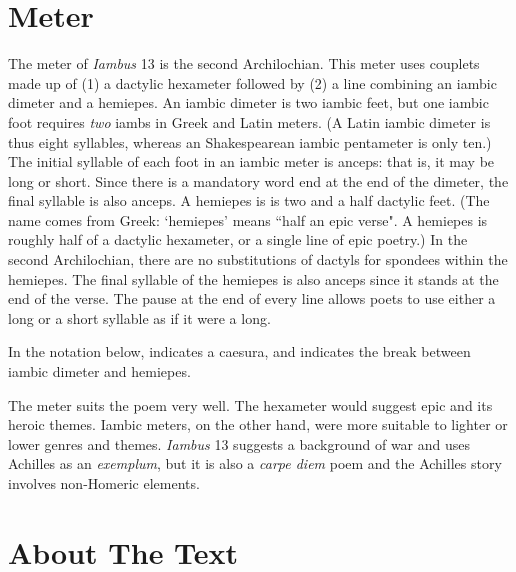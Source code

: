 
\section*{Meter}

The meter of \textit{Iambus} 13 is the second Archilochian. This meter uses couplets made up of (1) a dactylic hexameter followed by (2) a line combining an iambic dimeter and a hemiepes.  An iambic dimeter is two iambic feet, but one iambic foot requires \textit{two} iambs in Greek and Latin meters.  (A Latin iambic dimeter is thus eight syllables, whereas an Shakespearean iambic pentameter is only ten.)  The initial syllable of each foot in an iambic meter is anceps: that is, it may be long or short.  Since there is a mandatory word end at the end of the dimeter, the final syllable is also anceps.  A hemiepes is is two and a half dactylic feet.  (The name comes from Greek: `hemiepes' means ``half an epic verse".  A hemiepes is roughly half of a dactylic hexameter, or a single line of epic poetry.)  In the second Archilochian, there are no substitutions of dactyls for spondees within the hemiepes.  The final syllable of the hemiepes is also anceps since it stands at the end of the verse.  The pause at the end of every line allows poets to use either a long or a short syllable as if it were a long.

In the notation below, \metra{\c} indicates a caesura, and \metra{\cc} indicates the break between iambic dimeter and hemiepes.\newline

\indent\metra{\m\mbb\m\mbb\m\c\mbb\m\mbb\m\mbb\m\mb}

\indent\indent\metra{\mb\m\b\m\mb\m\b\mb\cc\m\bb\m\bb\mb}\newline

The meter suits the poem very well.  The hexameter would suggest epic and its heroic themes.  Iambic meters, on the other hand, were more suitable to lighter or lower genres and themes.  \textit{Iambus} 13 suggests a background of war and uses Achilles as an \textit{exemplum}, but it is also a \textit{carpe diem} poem and the Achilles story involves non-Homeric elements.


\section*{About The Text}

